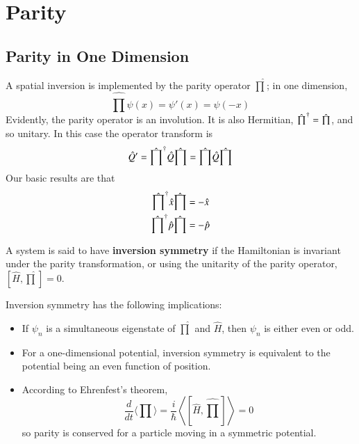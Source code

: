 \documentclass[12pt, a4paper, oneside, openright, titlepage]{book}
\begin{document}
\section{Parity}

\subsection{Parity in One Dimension}

A spatial inversion is implemented by the parity operator $\hat{\prod}$; in one dimension, \begin{equation*}
    \hat{\prod}\psi(x) = \psi'(x) = \psi(-x)
\end{equation*}
Evidently, the parity operator is an involution. It is also Hermitian, $\hat{\prod}^{\text{\textdagger}} = \hat{\prod}$, and so unitary. In this case the operator transform is \begin{equation*}
    \hat{Q}' = \hat{\prod}^{\text{\textdagger}}\hat{Q}\hat{\prod} = \hat{\prod}\hat{Q}\hat{\prod}
\end{equation*}
Our basic results are that \begin{align*}
    \hat{\prod}^{\text{\textdagger}}\hat{x}\hat{\prod} &= -\hat{x} \\
    \hat{\prod}^{\text{\textdagger}}\hat{p}\hat{\prod} &= -\hat{p}
\end{align*}

\begin{defn}
    A system is said to have \textbf{inversion symmetry} if the Hamiltonian is invariant under the parity transformation, or using the unitarity of the parity operator, $\left[\hat{H},\hat{\prod}\right] = 0$. 
\end{defn}
Inversion symmetry has the following implications: \begin{itemize}
    \item If $\psi_n$ is a simultaneous eigenstate of $\hat{\prod}$ and $\hat{H}$, then $\psi_n$ is either even or odd.
    \item For a one-dimensional potential, inversion symmetry is equivalent to the potential being an even function of position.\item According to Ehrenfest's theorem, \begin{equation*}
            \frac{d}{dt}\langle \prod\rangle = \frac{i}{\hbar}\left\langle \left[\hat{H},\hat{\prod}\right]\right\rangle = 0
    \end{equation*}
        so parity is conserved for a particle moving in a symmetric potential.
\end{itemize}
\end{document}

